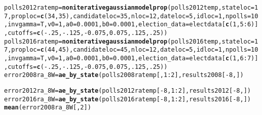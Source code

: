 \documentclass{article}\usepackage[]{graphicx}\usepackage[]{color}
\makeatletter
\newcommand{\hlnum}[1]{\textcolor[rgb]{0.686,0.059,0.569}{#1}}%
\newcommand{\hlopt}[1]{\textcolor[rgb]{0,0,0}{#1}}%
\newcommand{\hlstd}[1]{\textcolor[rgb]{0.345,0.345,0.345}{#1}}%
\newcommand{\hlkwb}[1]{\textcolor[rgb]{0.69,0.353,0.396}{#1}}%
\newcommand{\hlkwc}[1]{\textcolor[rgb]{0.333,0.667,0.333}{#1}}%
\newcommand{\hlkwd}[1]{\textcolor[rgb]{0.737,0.353,0.396}{\textbf{#1}}}%
\newenvironment{kframe}{%
 \def\at@end@of@kframe{}%
 \ifinner\ifhmode%
  \def\at@end@of@kframe{\end{minipage}}%
  \begin{minipage}{\columnwidth}%
 \fi\fi%
 \def\FrameCommand##1{\hskip\@totalleftmargin \hskip-\fboxsep
 \colorbox{shadecolor}{##1}\hskip-\fboxsep
     \hskip-\linewidth \hskip-\@totalleftmargin \hskip\columnwidth}%
 \MakeFramed {\advance\hsize-\width
   \@totalleftmargin\z@ \linewidth\hsize
   \@setminipage}}%
 {\par\unskip\endMakeFramed%
 \at@end@of@kframe}
\newenvironment{knitrout}{}{} %
\makeatother
\begin{document}
\begin{knitrout}
\begin{kframe}
\begin{alltt}
\hlstd{polls2012ratemp} \hlkwb{=} \hlkwd{noniterativegaussianmodelprop}\hlstd{(polls2012temp,} \hlkwc{stateloc} \hlstd{=} \hlnum{17}\hlstd{,} \hlkwc{proploc} \hlstd{=} \hlkwd{c}\hlstd{(}\hlnum{34}\hlstd{,} \hlnum{35}\hlstd{),} \hlkwc{candidateloc} \hlstd{=} \hlnum{35}\hlstd{,}  \hlkwc{nloc} \hlstd{=} \hlnum{12}\hlstd{,} \hlkwc{dateloc} \hlstd{=} \hlnum{5}\hlstd{,} \hlkwc{idloc} \hlstd{=} \hlnum{1}\hlstd{,}  \hlkwc{npolls} \hlstd{=} \hlnum{10}\hlstd{,}\hlkwc{invgamma} \hlstd{= T,} \hlkwc{v0}\hlstd{=}\hlnum{1}\hlstd{,} \hlkwc{a0}\hlstd{=}\hlnum{0.0001}\hlstd{,} \hlkwc{b0}\hlstd{=}\hlnum{0.0001}\hlstd{,}  \hlkwc{election_data} \hlstd{= electdata[}\hlkwd{c}\hlstd{(}\hlnum{1}\hlstd{,} \hlnum{5}\hlopt{:}\hlnum{6}\hlstd{)],} \hlkwc{cutoffs} \hlstd{=} \hlkwd{c}\hlstd{(}\hlopt{-}\hlnum{.25}\hlstd{,} \hlopt{-}\hlnum{.125}\hlstd{,} \hlopt{-}\hlnum{0.075}\hlstd{,} \hlnum{0.075}\hlstd{,} \hlnum{.125}\hlstd{,} \hlnum{.25}\hlstd{))}
\hlstd{polls2016ratemp} \hlkwb{=} \hlkwd{noniterativegaussianmodelprop}\hlstd{(polls2016temp,} \hlkwc{stateloc} \hlstd{=} \hlnum{17}\hlstd{,} \hlkwc{proploc} \hlstd{=} \hlkwd{c}\hlstd{(}\hlnum{44}\hlstd{,} \hlnum{45}\hlstd{),} \hlkwc{candidateloc} \hlstd{=} \hlnum{45}\hlstd{,} \hlkwc{nloc} \hlstd{=} \hlnum{12}\hlstd{,} \hlkwc{dateloc} \hlstd{=} \hlnum{5}\hlstd{,} \hlkwc{idloc} \hlstd{=} \hlnum{1}\hlstd{,}\hlkwc{npolls} \hlstd{=} \hlnum{10}\hlstd{,} \hlkwc{invgamma} \hlstd{= T,} \hlkwc{v0}\hlstd{=}\hlnum{1}\hlstd{,} \hlkwc{a0}\hlstd{=}\hlnum{0.0001}\hlstd{,} \hlkwc{b0}\hlstd{=}\hlnum{0.0001}\hlstd{,} \hlkwc{election_data} \hlstd{= electdata[}\hlkwd{c}\hlstd{(}\hlnum{1}\hlstd{,} \hlnum{6}\hlopt{:}\hlnum{7}\hlstd{)],} \hlkwc{cutoffs} \hlstd{=} \hlkwd{c}\hlstd{(}\hlopt{-}\hlnum{.25}\hlstd{,} \hlopt{-}\hlnum{.125}\hlstd{,} \hlopt{-}\hlnum{0.075}\hlstd{,} \hlnum{0.075}\hlstd{,} \hlnum{.125}\hlstd{,} \hlnum{.25}\hlstd{))}
\hlstd{error2008ra_8W} \hlkwb{=} \hlkwd{ae_by_state}\hlstd{(polls2008ratemp[,} \hlnum{1}\hlopt{:}\hlnum{2}\hlstd{], results2008[}\hlopt{-}\hlnum{8}\hlstd{, ])}
\end{alltt}


{\ttfamily\noindent\color{warningcolor}{\#\# Warning in ae\_by\_state(polls2008ratemp[, 1:2], results2008[-8, ]): Predicted names do not match names of actual data}}

{\ttfamily\noindent\bfseries\color{errorcolor}{\#\# Error in ae\_by\_state(polls2008ratemp[, 1:2], results2008[-8, ]): Incompatiable dimensions of predicted and actual}}\begin{alltt}
\hlstd{error2012ra_8W} \hlkwb{=} \hlkwd{ae_by_state}\hlstd{(polls2012ratemp[}\hlopt{-}\hlnum{8}\hlstd{,} \hlnum{1}\hlopt{:}\hlnum{2}\hlstd{], results2012[}\hlopt{-}\hlnum{8}\hlstd{, ])}
\hlstd{error2016ra_8W} \hlkwb{=} \hlkwd{ae_by_state}\hlstd{(polls2016ratemp[}\hlopt{-}\hlnum{8}\hlstd{,} \hlnum{1}\hlopt{:}\hlnum{2}\hlstd{], results2016[}\hlopt{-}\hlnum{8}\hlstd{, ])}
\hlkwd{mean}\hlstd{(error2008ra_8W[,}\hlnum{2}\hlstd{])}
\end{alltt}



\end{kframe}
\end{knitrout}
\end{document}
